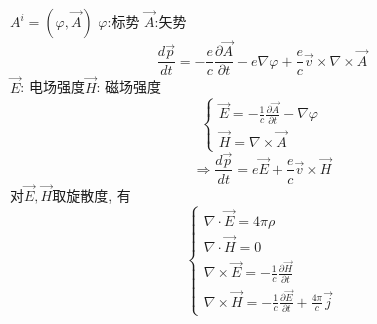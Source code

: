 \documentclass{article}
\begin{document}
$A^{i}=(\varphi,\vec A)$ \quad$\varphi$:标势 \quad$\vec A$:矢势
\[\frac{d\vec p}{dt} = - \frac{e}{c} \frac{\partial\vec A}{\partial t} - e \nabla \varphi + \frac{e}{c} \vec v \times \nabla \times \vec A\]
$\vec E$: 电场强度\quad $\vec H$: 磁场强度
\begin{displaymath}
    \left\{ \begin{array}{ll}
    \vec E = -\frac{1}{c} \frac{\partial \vec A}{\partial t} - \nabla \varphi\\
    \vec H = \nabla \times \vec A
    \end{array} \right.
\end{displaymath}
\[\Rightarrow \frac{d\vec p}{dt} = e \vec E + \frac{e}{c} \vec v \times \vec H\]
对$\vec E,\vec H$取旋散度, 有
\begin{displaymath}
    \left\{ \begin{array}{ll}
    \nabla \cdot \vec E = 4\pi\rho\\
    \nabla \cdot \vec H = 0\\
    \nabla \times \vec E = - \frac{1}{c} \frac{\partial \vec H}{\partial t}\\
    \nabla \times \vec H = - \frac{1}{c} \frac{\partial \vec E}{\partial t} + \frac{4\pi}{c}\vec j
    \end{array} \right.
\end{displaymath}
\end{document}
